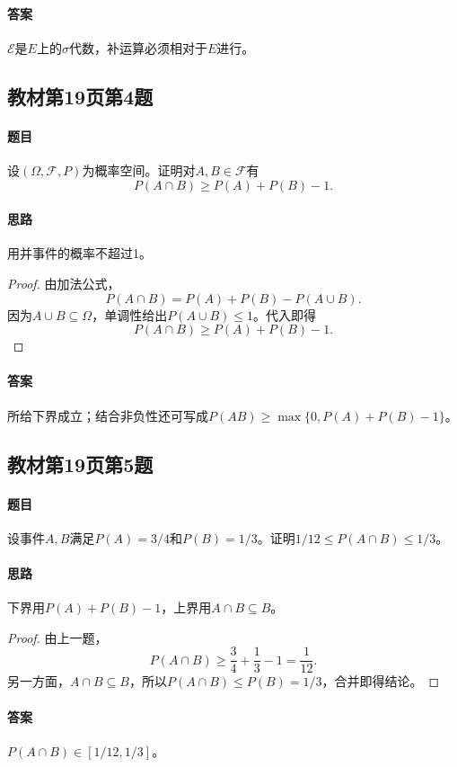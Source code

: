 \paragraph{答案}$\mathscr E$是$E$上的$\sigma$代数，补运算必须相对于$E$进行。

\subsection{教材第19页第4题}\label{ex:w02-t4}
\paragraph{题目}
设$(\Omega,\mathscr F,P)$为概率空间。证明对$A,B\in\mathscr F$有
\[P(A\cap B)\geq P(A)+P(B)-1.\]
\paragraph{思路}用并事件的概率不超过1。
\begin{proof}
由加法公式，
\[P(A\cap B)=P(A)+P(B)-P(A\cup B).\]
因为$A\cup B\subseteq\Omega$，单调性给出$P(A\cup B)\leq1$。代入即得
\[P(A\cap B)\geq P(A)+P(B)-1.\]
\end{proof}
\paragraph{答案}所给下界成立；结合非负性还可写成$P(AB)\geq\max\{0,P(A)+P(B)-1\}$。

\subsection{教材第19页第5题}\label{ex:w02-t5}
\paragraph{题目}
设事件$A,B$满足$P(A)=3/4$和$P(B)=1/3$。证明$1/12\leq P(A\cap B)\leq1/3$。
\paragraph{思路}下界用$P(A)+P(B)-1$，上界用$A\cap B\subseteq B$。
\begin{proof}
由上一题，
\[P(A\cap B)\geq\frac34+\frac13-1=\frac1{12}.\]
另一方面，$A\cap B\subseteq B$，所以$P(A\cap B)\leq P(B)=1/3$，合并即得结论。
\end{proof}
\paragraph{答案}$P(A\cap B)\in[1/12,1/3]$。


